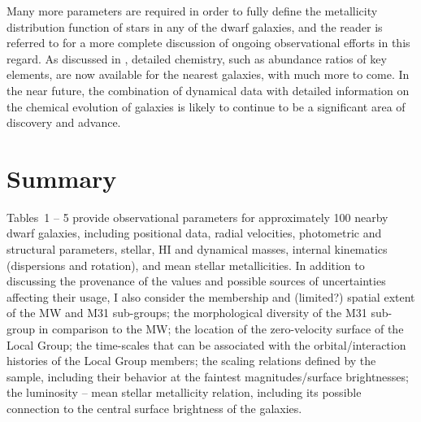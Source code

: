 \documentclass[manuscript]{aastex}
\begin{document}
Many more parameters are required in order to fully define the
metallicity distribution function of stars in any of the dwarf
galaxies, and the reader is referred to \cite{tolstoy2009} for a more
complete discussion of ongoing observational efforts in this
regard. As discussed in \cite{tolstoy2009}, detailed chemistry, such
as abundance ratios of key elements, are now available for the nearest
galaxies, with much more to come. In the near future, the combination
of dynamical data with detailed information on the chemical evolution
of galaxies is likely to continue to be a significant area of
discovery and advance.

\section{Summary}

Tables~1 -- 5 provide observational parameters for approximately 100
nearby dwarf galaxies, including positional data, radial velocities,
photometric and structural parameters, stellar, HI and dynamical
masses, internal kinematics (dispersions and rotation), and mean
stellar metallicities. In addition to discussing the provenance of the
values and possible sources of uncertainties affecting their usage, I
also consider the membership and (limited?) spatial extent of the MW
and M31 sub-groups; the morphological diversity of the M31 sub-group
in comparison to the MW; the location of the zero-velocity surface of
the Local Group; the time-scales that can be associated with the
orbital/interaction histories of the Local Group members; the scaling
relations defined by the sample, including their behavior at the
faintest magnitudes/surface brightnesses; the luminosity -- mean
stellar metallicity relation, including its possible connection to the central
surface brightness of the galaxies.
\end{document}
